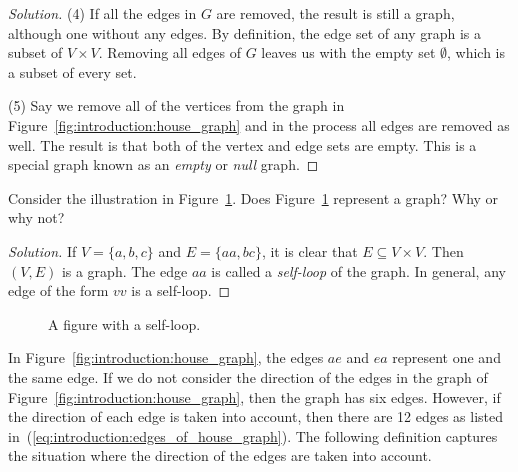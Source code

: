 \begin{proof}[Solution]
(4) If all the edges in $G$ are removed, the result is still a graph,
although one without any edges. By definition, the edge set of any
graph is a subset of $V \times V$. Removing all edges of $G$ leaves us
with the empty set $\emptyset$, which is a subset of every set.

(5) Say we remove all of the vertices from the graph in
Figure~\ref{fig:introduction:house_graph} and in the process all edges
are removed as well. The result is that both of the vertex and edge
sets are empty. This is a special graph known as an \emph{empty} or
\emph{null} graph.
\end{proof}

\begin{exercise}
Consider the illustration in
Figure~\ref{fig:introduction:self_loop}. Does
Figure~\ref{fig:introduction:self_loop} represent a graph? Why or why not?
\end{exercise}

\begin{proof}[Solution]
If $V = \{ a, b, c \}$ and $E = \{ aa, bc \}$, it is clear that $E
\subseteq V \times V$. Then $(V, E)$ is a graph. The edge $aa$ is
called a \emph{self-loop} of the graph. In general, any edge of the
form $vv$ is a self-loop.
\end{proof}

\begin{figure}[!htbp]
\centering
{}
\caption{A figure with a self-loop.}
\label{fig:introduction:self_loop}
\end{figure}

In Figure~\ref{fig:introduction:house_graph}, the edges $ae$ and $ea$
represent one and the same edge. If we do not consider the direction
of the edges in the graph of
Figure~\ref{fig:introduction:house_graph}, then the graph has six
edges. However, if the direction of each edge is taken into account,
then there are 12 edges as listed
in~(\ref{eq:introduction:edges_of_house_graph}). The following
definition captures the situation where the direction of the edges are
taken into account.

